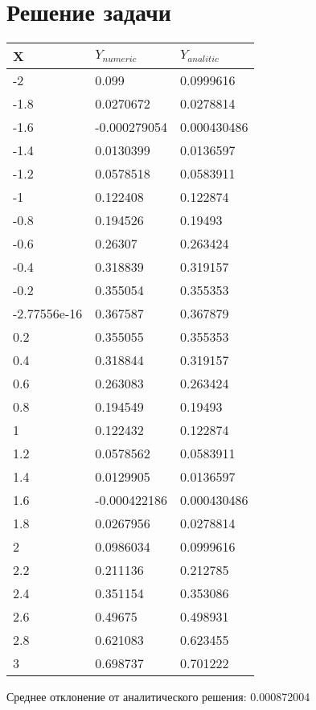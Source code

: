 \documentclass[a4paper,14pt]{extarticle}
\begin{document}
\section{Решение задачи}

\begin{longtable}{|m{3cm}|m{3cm}|m{3cm}|}
\hline
\cellcolor{lightgray} X & \cellcolor{lightgray} $Y_{numeric}$ & \cellcolor{lightgray} $Y_{analitic}$\\
\hline
-2 & 0.099 & 0.0999616\\
\hline
-1.8 & 0.0270672 & 0.0278814\\
\hline
-1.6 & -0.000279054 & 0.000430486\\
\hline
-1.4 & 0.0130399 & 0.0136597\\
\hline
-1.2 & 0.0578518 & 0.0583911\\
\hline
-1 & 0.122408 & 0.122874\\
\hline
-0.8 & 0.194526 & 0.19493\\
\hline
-0.6 & 0.26307 & 0.263424\\
\hline
-0.4 & 0.318839 & 0.319157\\
\hline
-0.2 & 0.355054 & 0.355353\\
\hline
-2.77556e-16 & 0.367587 & 0.367879\\
\hline
0.2 & 0.355055 & 0.355353\\
\hline
0.4 & 0.318844 & 0.319157\\
\hline
0.6 & 0.263083 & 0.263424\\
\hline
0.8 & 0.194549 & 0.19493\\
\hline
1 & 0.122432 & 0.122874\\
\hline
1.2 & 0.0578562 & 0.0583911\\
\hline
1.4 & 0.0129905 & 0.0136597\\
\hline
1.6 & -0.000422186 & 0.000430486\\
\hline
1.8 & 0.0267956 & 0.0278814\\
\hline
2 & 0.0986034 & 0.0999616\\
\hline
2.2 & 0.211136 & 0.212785\\
\hline
2.4 & 0.351154 & 0.353086\\
\hline
2.6 & 0.49675 & 0.498931\\
\hline
2.8 & 0.621083 & 0.623455\\
\hline
3 & 0.698737 & 0.701222\\
\hline
\end{longtable}

Среднее отклонение от аналитического решения: 0.000872004
\end{document}

